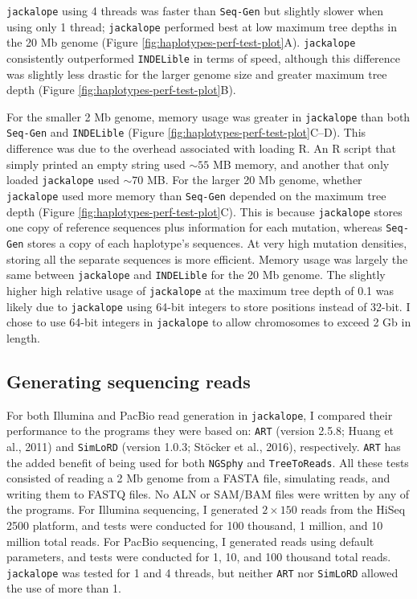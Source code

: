 \documentclass[12pt,]{article}
\begin{document}
\texttt{jackalope} using 4 threads was faster than \texttt{Seq-Gen} but
slightly slower when using only 1 thread;
\texttt{jackalope} performed best at low maximum tree depths in the 20 Mb genome
(Figure \ref{fig:haplotypes-perf-test-plot}A).
\texttt{jackalope} consistently outperformed \texttt{INDELible} in terms of speed, although this
difference was slightly less drastic for the larger genome size and
greater maximum tree depth (Figure \ref{fig:haplotypes-perf-test-plot}B).

For the smaller 2 Mb genome, memory usage was greater in \texttt{jackalope} than both
\texttt{Seq-Gen} and \texttt{INDELible} (Figure \ref{fig:haplotypes-perf-test-plot}C--D).
This difference was due to the overhead associated with loading R.
An R script that simply printed an empty string used \(\sim 55\) MB memory,
and another that only loaded \texttt{jackalope} used \(\sim 70\) MB.
For the larger 20 Mb genome, whether \texttt{jackalope} used more memory than \texttt{Seq-Gen}
depended on the maximum tree depth (Figure \ref{fig:haplotypes-perf-test-plot}C).
This is because \texttt{jackalope} stores one copy of reference sequences plus information
for each mutation, whereas \texttt{Seq-Gen} stores a copy of each haplotype's sequences.
At very high mutation densities, storing all the separate sequences is more efficient.
Memory usage was largely the same between \texttt{jackalope} and \texttt{INDELible} for the 20 Mb
genome.
The slightly higher high relative usage of \texttt{jackalope} at the maximum tree depth of
0.1 was likely due to \texttt{jackalope} using 64-bit integers to store positions
instead of 32-bit.
I chose to use 64-bit integers in \texttt{jackalope} to allow chromosomes to exceed
2 Gb in length.

\hypertarget{generating-sequencing-reads}{%
\subsection{Generating sequencing reads}\label{generating-sequencing-reads}}

For both Illumina and PacBio read generation in \texttt{jackalope}, I compared their performance
to the programs they were based on:
\texttt{ART} (version 2.5.8; Huang et al., 2011) and
\texttt{SimLoRD} (version 1.0.3; Stöcker et al., 2016), respectively.
\texttt{ART} has the added benefit of being used for both \texttt{NGSphy} and \texttt{TreeToReads}.
All these tests consisted of reading a 2 Mb genome from a FASTA file, simulating
reads, and writing them to FASTQ files.
No ALN or SAM/BAM files were written by any of the programs.
For Illumina sequencing, I generated \(2 \times 150\) reads from the HiSeq 2500 platform,
and tests were conducted for 100 thousand, 1 million, and 10 million total reads.
For PacBio sequencing, I generated reads using default parameters,
and tests were conducted for 1, 10, and 100 thousand total reads.
\texttt{jackalope} was tested for 1 and 4 threads, but
neither \texttt{ART} nor \texttt{SimLoRD} allowed the use of more than 1.
\end{document}
